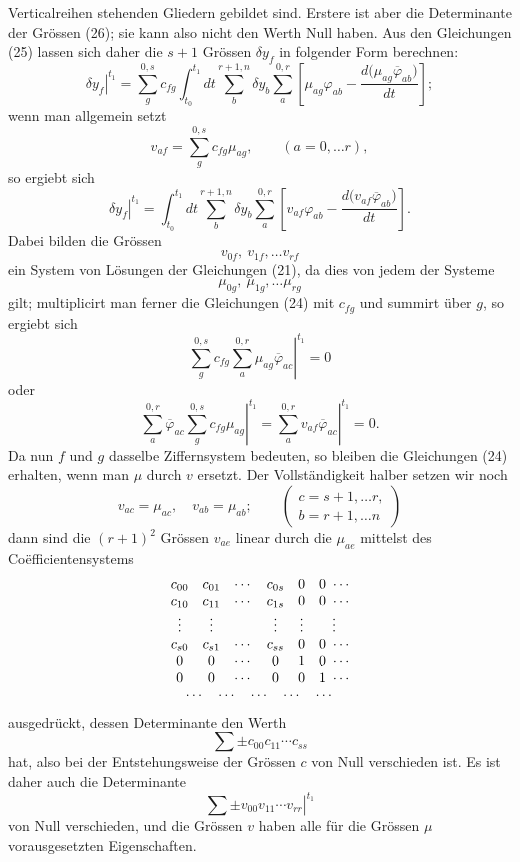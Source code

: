 \documentclass[11pt,a4paper,leqno]{article}
\begin{document}
Verticalreihen stehenden Gliedern gebildet sind. Erstere ist aber die Determinante der Grössen (26); sie kann also nicht den Werth Null haben. Aus den Gleichungen (25) lassen sich daher die $s+1$ Grössen $\delta y_f$ in folgender Form berechnen:
\[
\left.\delta y_f\right|^{t_1}
=
\sum_g^{0,s}c_{fg}\int_{t_0}^{t_1}dt\sum_b^{r+1,n}\delta y_b\sum_a^{0,r}
\left[
\mu_{ag}\varphi_{ab}-\frac{d\bigl(\mu_{ag}\overline{\varphi}_{ab}\bigr)}{dt}
\right];
\]
wenn man allgemein setzt
\[
v_{af}=\sum_g^{0,s}c_{fg}\mu_{ag},
\qquad(a=0,\ldots r),
\]
so ergiebt sich
\begin{equation}\tag{28}
\left.\delta y_f\right|^{t_1}
=
\int_{t_0}^{t_1}dt\sum_b^{r+1,n}\delta y_b\sum_a^{0,r}
\left[
v_{af}\varphi_{ab}-\frac{d\bigl(v_{af}\overline{\varphi}_{ab}\bigr)}{dt}
\right].
\end{equation}
Dabei bilden die Grössen
\[
v_{0f},\ v_{1f},\ldots v_{rf}
\]
ein System von Lösungen der Gleichungen (21), da dies von jedem der Systeme
\[
\mu_{0g},\ \mu_{1g},\ldots\mu_{rg}
\]
gilt; multiplicirt man ferner die Gleichungen (24) mit $c_{fg}$ und summirt über $g$, so ergiebt sich
\[
\left.
\sum_g^{0,s}c_{fg}\sum_a^{0,r}\mu_{ag}\overline{\varphi}_{ac}
\right|^{t_1}=0
\]
oder
\[
\left.
\sum_a^{0,r}\overline{\varphi}_{ac}\sum_g^{0,s}c_{fg}\mu_{ag}
\right|^{t_1}
=
\left.\sum_a^{0,r}v_{af}\overline{\varphi}_{ac}\right|^{t_1}=0.
\]
Da nun $f$ und $g$ dasselbe Ziffernsystem bedeuten, so bleiben die Gleichungen (24) erhalten, wenn man $\mu$ durch $v$ ersetzt. Der Vollständigkeit halber setzen wir noch
\[
v_{ac}=\mu_{ac},\quad v_{ab}=\mu_{ab};
\qquad
\left(
\begin{gathered}
c=s+1,\ldots r,\\
b=r+1,\ldots n
\end{gathered}
\right)
\]
dann sind die $(r+1)^2$ Grössen $v_{ae}$ linear durch die $\mu_{ae}$ mittelst des Coëfficientensystems
\[
\begin{array}{cccccc}
c_{00}&c_{01}&\cdots&c_{0s}&0&0\ \cdots\\
c_{10}&c_{11}&\cdots&c_{1s}&0&0\ \cdots\\
\vdots&\vdots&&\vdots&\vdots&\vdots\\
c_{s0}&c_{s1}&\cdots&c_{ss}&0&0\ \cdots\\
0&0&\cdots&0&1&0\ \cdots\\
0&0&\cdots&0&0&1\ \cdots\\
\multicolumn{6}{c}{\cdots\quad\cdots\quad\cdots\quad\cdots\quad\cdots}
\end{array}
\]
ausgedrückt, dessen Determinante den Werth
\[
\sum\mathord{\pm}c_{00}c_{11}\cdots c_{ss}
\]
hat, also bei der Entstehungsweise der Grössen $c$ von Null verschieden ist. Es ist daher auch die Determinante
\[
\left.\sum\mathord{\pm}v_{00}v_{11}\cdots v_{rr}\right|^{t_1}
\]
von Null verschieden, und die Grössen $v$ haben alle für die Grössen $\mu$ vorausgesetzten Eigenschaften.
\end{document}
